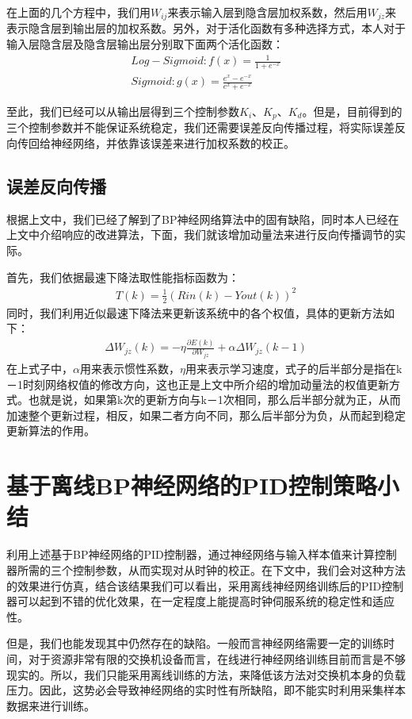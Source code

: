 在上面的几个方程中，我们用$W_{ij}$来表示输入层到隐含层加权系数，然后用$W_{jz}$来表示隐含层到输出层的加权系数。另外，对于活化函数有多种选择方式，本人对于输入层\-隐含层及隐含层\-输出层分别取下面两个活化函数：
\begin{align}
Log-Sigmoid : f(x) = \frac{1}{1 + e^{-x}} \\
Sigmoid : g(x) = \frac{e^{x} - e^{-x}}{e^{x} + e^{-x}}
\end{align}

至此，我们已经可以从输出层得到三个控制参数$K_{i}$、$K_{p}$、$K_{d}$。但是，目前得到的三个控制参数并不能保证系统稳定，我们还需要误差反向传播过程，将实际误差反向传回给神经网络，并依靠该误差来进行加权系数的校正。

\subsection{误差反向传播}
根据上文中，我们已经了解到了BP神经网络算法中的固有缺陷，同时本人已经在上文中介绍响应的改进算法，下面，我们就该增加动量法来进行反向传播调节的实际。

首先，我们依据最速下降法取性能指标函数为：
\begin{align}
T(k) = \frac{1}{2}(Rin(k) - Yout(k))^{2}
\end{align}
同时，我们利用近似最速下降法来更新该系统中的各个权值，具体的更新方法如下：
\begin{align}
\Delta W_{jz}(k) = -\eta \frac{\partial E(k)}{\partial W_{jz}} + \alpha \Delta W_{jz}(k-1)
\end{align}
在上式子中，$\alpha$用来表示惯性系数，$\eta$用来表示学习速度，式子的后半部分是指在k－1时刻网络权值的修改方向，这也正是上文中所介绍的增加动量法的权值更新方式。也就是说，如果第k次的更新方向与k－1次相同，那么后半部分就为正，从而加速整个更新过程，相反，如果二者方向不同，那么后半部分为负，从而起到稳定更新算法的作用。

\section{基于离线BP神经网络的PID控制策略小结}
利用上述基于BP神经网络的PID控制器，通过神经网络与输入样本值来计算控制器所需的三个控制参数，从而实现对从时钟的校正。在下文中，我们会对这种方法的效果进行仿真，结合该结果我们可以看出，采用离线神经网络训练后的PID控制器可以起到不错的优化效果，在一定程度上能提高时钟伺服系统的稳定性和适应性。

但是，我们也能发现其中仍然存在的缺陷。一般而言神经网络需要一定的训练时间，对于资源非常有限的交换机设备而言，在线进行神经网络训练目前而言是不够现实的。所以，我们只能采用离线训练的方法，来降低该方法对交换机本身的负载压力。因此，这势必会导致神经网络的实时性有所缺陷，即不能实时利用采集样本数据来进行训练。

